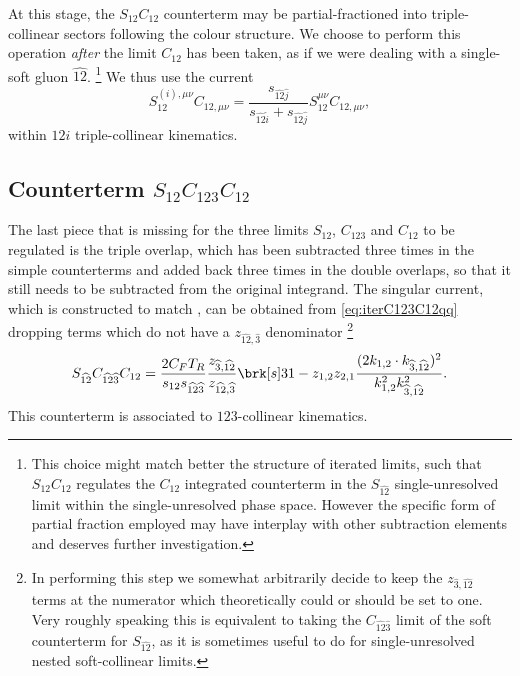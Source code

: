 \documentclass[11pt,a4paper]{article}
\newcommand{\mgd}[1]{\widehat{#1}}
\begin{document}
At this stage, the $S_{12}C_{12}$ counterterm may be partial-fractioned
into triple-collinear sectors following the colour structure.
We choose to perform this operation \emph{after} the limit $C_{12}$
has been taken, as if we were dealing with a single-soft gluon $\mgd{12}$.%
\footnote{
This choice might match better the structure of iterated limits,
such that $S_{12}C_{12}$ regulates the $C_{12}$ integrated counterterm
in the $S_{\mgd{12}}$ single-unresolved limit
within the single-unresolved phase space.
However the specific form of partial fraction employed
may have interplay with other subtraction elements
and deserves further investigation.
}
We thus use the current
\begin{equation}
	S_{12}^{(i),\mu\nu} C_{12,\mu\nu}
	= \frac{s_{\mgd{12}\mgd{j}}}{s_{\mgd{12}\mgd{i}}+s_{\mgd{12}\mgd{j}}}
	S_{12}^{\mu\nu} C_{12,\mu\nu},
\end{equation}
within $12i$ triple-collinear kinematics.


\subsection{Counterterm $S_{12}C_{123}C_{12}$}

The last piece that is missing for the three limits
$S_{12}$, $C_{123}$ and $C_{12}$ to be regulated is the triple overlap,
which has been subtracted three times in the simple counterterms
and added back three times in the double overlaps,
so that it still needs to be subtracted from the original integrand.
The singular current, which is constructed to match \cite{Somogyi:2006da},
can be obtained from \cref{eq:iterC123C12qq} dropping terms
which do not have a $z_{\mgd{12},\mgd{3}}$ denominator%
\footnote{
In performing this step we somewhat arbitrarily decide
to keep the $z_{\mgd{3},\mgd{12}}$ terms at the numerator
which theoretically could or should be set to one.
Very roughly speaking this is equivalent to taking
the $C_{\mgd{12}\mgd{3}}$ limit of the soft counterterm for $S_{\mgd{12}}$,
as it is sometimes useful to do for single-unresolved
nested soft-collinear limits.
}
\begin{equation}
	S_{\mgd{12}} C_{\mgd{12}\mgd{3}} C_{12}
	= \frac{2 C_F T_R}{s_{12}s_{\mgd{12}\mgd{3}}}
	\frac{z_{\mgd{3},\mgd{12}}}{z_{\mgd{12},\mgd{3}}}
	\brk[s]3{
		1 - z_{1,2} z_{2,1}
		\frac{(2k_{1,2}\cdot k_{\mgd{3},\mgd{12}})^2}
		{k_{1,2}^2 k_{\mgd{3},\mgd{12}}^2}
	}.
\end{equation}
This counterterm is associated to $123$-collinear kinematics.
\end{document}
